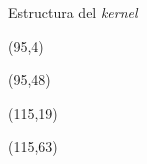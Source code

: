 \documentclass[aspectratio=169]{beamer}
\begin{document}
\begin{frame}{Estructura del \emph{kernel}}
\begin{textblock}{78}
{    }
    \end{textblock}
    \begin{textblock}{60}(95,4)   \end{textblock}
    \begin{textblock}{60}(95,48)  \end{textblock}
    \begin{textblock}{60}(115,19)  \end{textblock}
    \begin{textblock}{60}(115,63)  \end{textblock}
\end{frame}
\end{document}

